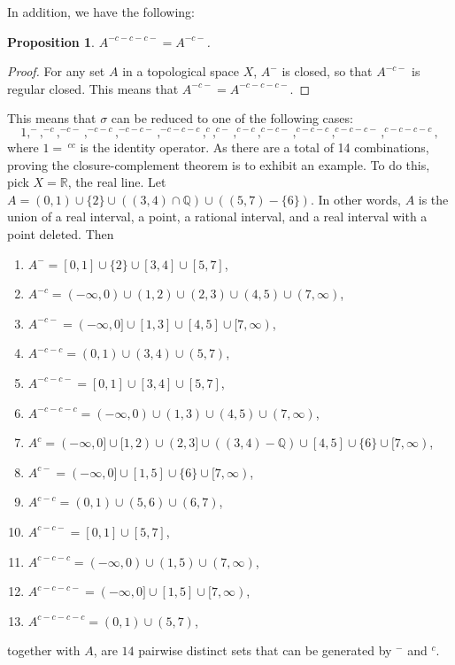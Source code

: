\documentclass[12pt]{article}
\newtheorem{prop}{Proposition}
\begin{document}
In addition, we have the following:
\begin{prop}  $A^{-c-c-c-}=A^{-c-}$. \end{prop}
\begin{proof}  For any set $A$ in a topological space $X$, $A^{-}$ is closed, so that $A^{-c-}$ is regular closed.  This means that $A^{-c-}=A^{-c-c-c-}$.
\end{proof}
This means that $\sigma$ can be reduced to one of the following cases: $$1, ^-, ^{-c}, ^{-c-}, ^{-c-c}, ^{-c-c-}, ^{-c-c-c}, ^c, ^{c-}, ^{c-c}, ^{c-c-}, ^{c-c-c}, ^{c-c-c-}, ^{c-c-c-c},$$ where $1=\, ^{cc}$ is the identity operator.  As there are a total of 14 combinations, proving the closure-complement theorem is to exhibit an example.  To do this, pick $X=\mathbb{R}$, the real line.  Let $A=(0,1)\cup \lbrace 2\rbrace \cup ((3,4)\cap \mathbb{Q}) \cup ((5,7)-\lbrace 6\rbrace)$.  In other words, $A$ is the union of a real interval, a point, a rational interval, and a real interval with a point deleted.  Then
\begin{enumerate}
\item $A^-=[0,1]\cup \lbrace 2\rbrace \cup [3,4]\cup [5,7]$,
\item $A^{-c}=(-\infty,0)\cup (1,2)\cup (2,3)\cup (4,5)\cup (7,\infty)$,
\item $A^{-c-}=(-\infty,0]\cup [1,3]\cup [4,5]\cup [7,\infty)$,
\item $A^{-c-c}=(0,1)\cup (3,4)\cup (5,7)$,
\item $A^{-c-c-}=[0,1]\cup [3,4]\cup [5,7]$,
\item $A^{-c-c-c}=(-\infty,0)\cup (1,3)\cup (4,5)\cup (7,\infty)$,
\item $A^c=(-\infty,0]\cup [1,2)\cup (2,3]\cup ((3,4)-\mathbb{Q}) \cup [4,5]\cup \lbrace 6\rbrace \cup [7,\infty)$,
\item $A^{c-}=(-\infty,0]\cup [1,5]\cup \lbrace 6\rbrace \cup [7,\infty)$,
\item $A^{c-c}=(0,1)\cup (5,6)\cup (6,7)$,
\item $A^{c-c-}=[0,1]\cup [5,7]$,
\item $A^{c-c-c}=(-\infty,0)\cup (1,5)\cup (7,\infty)$,
\item $A^{c-c-c-}=(-\infty,0]\cup [1,5]\cup [7,\infty)$,
\item $A^{c-c-c-c}=(0,1)\cup (5,7)$,
\end{enumerate}
together with $A$, are $14$ pairwise distinct sets that can be generated by $^-$ and $^c$.
\end{document}
